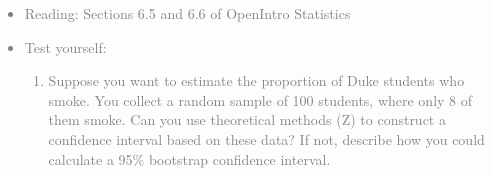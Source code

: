 \documentclass[11pt]{article}
\newcommand{\gray}[1]{\textcolor{gray}{#1}}
\begin{document}
\gray{
{\it
\vspace{-0.55cm}
\begin{itemize}
\renewcommand{\labelitemi}{{\textcolor{dark}{$\ast$}}}
\item Reading: Sections 6.5 and 6.6 of OpenIntro Statistics
\item Test yourself:
\begin{enumerate}
\item Suppose you want to estimate the proportion of Duke students who smoke. You collect a random sample of 100 students, where only 8 of them smoke. Can you use theoretical methods (Z) to construct a confidence interval based on these data? If not, describe how you could calculate a 95\% bootstrap confidence interval.
\end{enumerate}
\end{itemize}
}}
\end{document}
